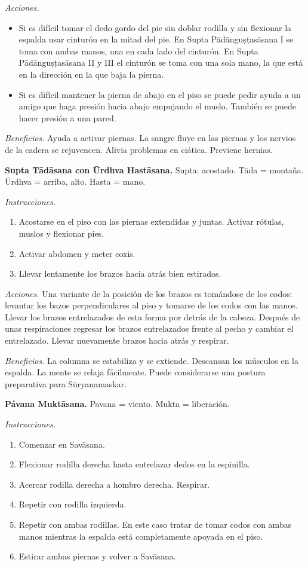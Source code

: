 \emph{Acciones.}
\begin{itemize}
\item Si es difícil tomar el dedo gordo del
pie sin doblar rodilla y sin flexionar la
espalda usar cinturón en la mitad del pie. En
Supta Pādānguṣṭasāsana I se toma con ambas
manos, una en cada lado del cinturón. En
Supta Pādānguṣṭasāsana II y III el cinturón
se toma con una sola mano, la que está en la
dirección en la que baja la pierna.
\item Si es difícil mantener la pierna de
abajo en el piso se puede pedir ayuda a un
amigo que haga presión hacia abajo empujando
el muslo. También se puede hacer presión a
una pared.
\end{itemize}

\emph{Beneficios.} Ayuda a activar piernas.
La sangre fluye en las piernas y los nervios
de la cadera se rejuvencen. Alivia problemas
en ciática. Previene hernias.

\medskip\noindent\textbf{Supta Tādāsana con
Ūrdhva Hastāsana.}
Supta: acostado. Tāda = montaña. Ūrdhva =
arriba, alto. Hasta = mano.

\emph{Instrucciones.}
\begin{enumerate}
\item Acostarse en el piso con las piernas
extendidas y juntas. Activar rótulas, muslos
y flexionar pies.
\item Activar abdomen y meter coxis.
\item Llevar lentamente los brazos hacia
atrás bien estirados.
\end{enumerate}

\emph{Acciones.} Una variante de la posición
de los brazos es tomándose de los codos:
levantar los bazos perpendiculares al piso y
tomarse de los codos con las manos. Llevar
los brazos entrelazados de esta forma por
detrás de la cabeza. Después de unas
respiraciones regresar los brazos
entrelazados frente al pecho y cambiar el
entrelazado. Llevar nuevamente brazos hacia
atrás y respirar.

\emph{Beneficios.} La columna se estabiliza y
se extiende. Descansan los músculos en la
espalda. La mente se relaja fácilmente. Puede
considerarse una postura preparativa para
Sūryanamaskar.

\medskip\noindent\textbf{Pávana Muktāsana.}
Pavana = viento. Mukta = liberación.

\emph{Instrucciones.}
\begin{enumerate}
\item Comenzar en Savāsana.
\item Flexionar rodilla derecha hasta
entrelazar dedos en la espinilla.
\item Acercar rodilla derecha a hombro
derecha. Respirar.
\item Repetir con rodilla izquierda.
\item Repetir con ambas rodillas. En este
caso tratar de tomar codos con ambas manos
mientras la espalda está completamente
apoyada en el piso.
\item Estirar ambas piernas y volver a
Savāsana.
\end{enumerate}

